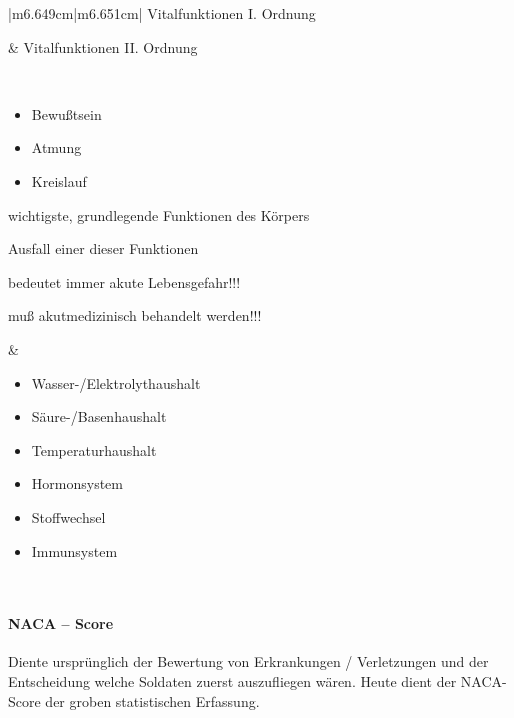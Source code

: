 \documentclass{article}
\newcommand\gZ[1]{\textcolor[rgb]{0.5019608,0.5019608,0.5019608}{#1}}
\begin{document}
\begin{center}
\tablehead{}\begin{supertabular}{|m{6.649cm}|m{6.651cm}|}
\hline
{\mdseries\color{black} Vitalfunktionen I. Ordnung}

 &
{\mdseries\color{black} Vitalfunktionen II. Ordnung}

\\\hline
\begin{itemize}
\item {\mdseries Bewu{\ss}tsein}

\item {\mdseries Atmung}

\item {\mdseries Kreislauf}

\end{itemize}
{\mdseries wichtigste, grundlegende Funktionen des K\"orpers}

{\mdseries Ausfall einer dieser Funktionen }

{\mdseries bedeutet immer akute Lebensgefahr!!! }

{\mdseries mu{\ss} akutmedizinisch behandelt werden!!!}

 &
\begin{itemize}
\item {\mdseries Wasser-/Elektrolythaushalt}

\item {\mdseries S\"aure-/Basenhaushalt}

\item {\mdseries Temperaturhaushalt}

\item {\mdseries Hormonsystem}

\item {\mdseries Stoffwechsel}

\item {\mdseries Immunsystem}

\end{itemize}
\\\hline
\end{supertabular}
\end{center}
\paragraph[NACA -- Score]{NACA -- Score}
\index{NACA}{\mdseries
\gZ{National Advisory Committee for Aeronautics}}

{\mdseries
\gZ{Diente urspr\"unglich der Bewertung von 
Erkrankungen / Verletzungen und der Entscheidung welche Soldaten zuerst
auszufliegen w\"aren. Heute dient der NACA-Score der groben
statistischen Erfassung.  }}
\end{document}
